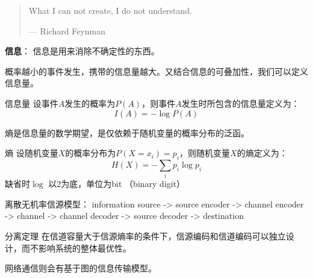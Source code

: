 \begin{quote}
    What I can not create, I do not understand.

    --- Richard Feynman
\end{quote}

\textbf{信息}： 信息是用来消除不确定性的东西。

概率越小的事件发生，携带的信息量越大。又结合信息的可叠加性，我们可以定义信息量。
\begin{definition}{信息量}
    设事件\(A\)发生的概率为\(P(A)\)，则事件\(A\)发生时所包含的信息量定义为：
    \[
        I(A) = -\log P(A)
    \]
\end{definition}

熵是信息量的数学期望，是仅依赖于随机变量的概率分布的泛函。
\begin{definition}{熵}
    设随机变量\(X\)的概率分布为\(P(X=x_i)=p_i\)，则随机变量\(X\)的熵定义为：
    \[
        H(X) = -\sum_i p_i \log p_i
    \]
    缺省时\(\log\) 以2为底，单位为bit （binary digit）
\end{definition}

离散无机率信源模型：
information source -> source encoder -> channel encoder -> channel ->
channel decoder -> source decoder -> destination

\begin{definition}{分离定理}
    在信道容量大于信源熵率的条件下，信源编码和信道编码可以独立设计，而不影响系统的整体最优性。
\end{definition}

网络通信则会有基于图的信息传输模型。